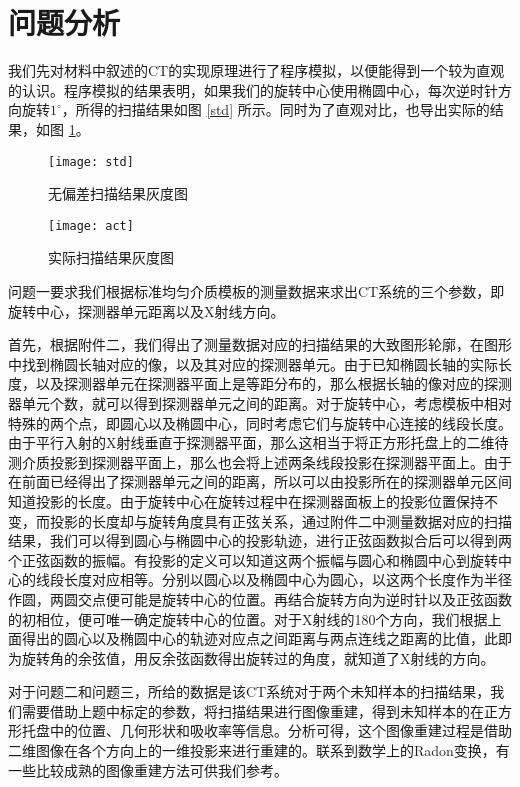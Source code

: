 \documentclass[withoutpreface,bwprint]{cumcmthesis} %
\begin{document}
\section{问题分析}

  我们先对材料中叙述的CT的实现原理进行了程序模拟，以便能得到一个较为直观的认识。程序模拟的结果表明，如果我们的旋转中心使用椭圆中心，每次逆时针方向旋转$1^{\circ}$，所得的扫描结果如图 \ref{std} 所示。同时为了直观对比，也导出实际的结果，如图 \ref{act}。

  \begin{figure}[!htbp]
    \begin{minipage}[t]{0.5\linewidth}
      \centering
      \texttt{[image: std]}
      \caption{无偏差扫描结果灰度图}
      \label{std}
    \end{minipage}
    \begin{minipage}[t]{0.5\linewidth}
      \centering
      \texttt{[image: act]}
      \caption{实际扫描结果灰度图}
      \label{act}
    \end{minipage}
  \end{figure}

  问题一要求我们根据标准均匀介质模板的测量数据来求出CT系统的三个参数，即旋转中心，探测器单元距离以及X射线方向。

  首先，根据附件二，我们得出了测量数据对应的扫描结果的大致图形轮廓，在图形中找到椭圆长轴对应的像，以及其对应的探测器单元。由于已知椭圆长轴的实际长度，以及探测器单元在探测器平面上是等距分布的，那么根据长轴的像对应的探测器单元个数，就可以得到探测器单元之间的距离。对于旋转中心，考虑模板中相对特殊的两个点，即圆心以及椭圆中心，同时考虑它们与旋转中心连接的线段长度。由于平行入射的X射线垂直于探测器平面，那么这相当于将正方形托盘上的二维待测介质投影到探测器平面上，那么也会将上述两条线段投影在探测器平面上。由于在前面已经得出了探测器单元之间的距离，所以可以由投影所在的探测器单元区间知道投影的长度。由于旋转中心在旋转过程中在探测器面板上的投影位置保持不变，而投影的长度却与旋转角度具有正弦关系，通过附件二中测量数据对应的扫描结果，我们可以得到圆心与椭圆中心的投影轨迹，进行正弦函数拟合后可以得到两个正弦函数的振幅。有投影的定义可以知道这两个振幅与圆心和椭圆中心到旋转中心的线段长度对应相等。分别以圆心以及椭圆中心为圆心，以这两个长度作为半径作圆，两圆交点便可能是旋转中心的位置。再结合旋转方向为逆时针以及正弦函数的初相位，便可唯一确定旋转中心的位置。对于X射线的180个方向，我们根据上面得出的圆心以及椭圆中心的轨迹对应点之间距离与两点连线之距离的比值，此即为旋转角的余弦值，用反余弦函数得出旋转过的角度，就知道了X射线的方向。

  对于问题二和问题三，所给的数据是该CT系统对于两个未知样本的扫描结果，我们需要借助上题中标定的参数，将扫描结果进行图像重建，得到未知样本的在正方形托盘中的位置、几何形状和吸收率等信息。分析可得，这个图像重建过程是借助二维图像在各个方向上的一维投影来进行重建的。联系到数学上的Radon变换，有一些比较成熟的图像重建方法可供我们参考。
\end{document}
